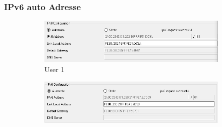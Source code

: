 \subsubsection{IPv6 auto Adresse}
\begin{figure}[!htb]
    \centering
    \begin{subfigure}{\textwidth}
        \includegraphics[width=\textwidth,height=\textwidth,keepaspectratio]{./img/user1.png}
        \caption{User 1}
    \end{subfigure}
    \begin{subfigure}{\textwidth}
        \includegraphics[width=\textwidth,height=\textwidth,keepaspectratio]{./img/user2.png}

\end{subfigure}
\end{figure}

